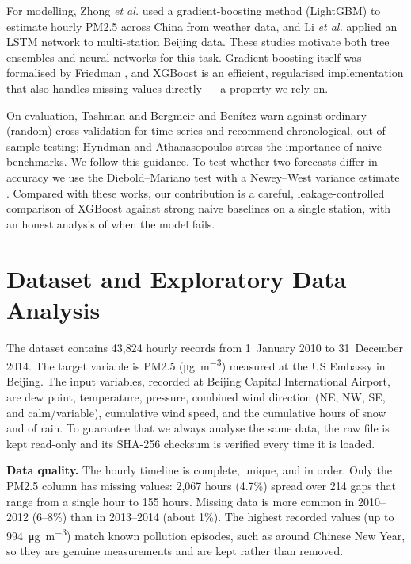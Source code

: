 \documentclass[onecolumn,11pt,journal]{IEEEtran}
\newcommand{\ugm}{\si{\micro\gram\per\cubic\metre}}
\begin{document}
For modelling, Zhong \emph{et al.} \cite{zhong2021lightgbm} used a gradient-boosting method (LightGBM) to estimate hourly PM2.5 across China from weather data, and Li \emph{et al.} \cite{li2017lstm} applied an LSTM network to multi-station Beijing data. These studies motivate both tree ensembles and neural networks for this task. Gradient boosting itself was formalised by Friedman \cite{friedman2001}, and XGBoost \cite{chen2016xgboost} is an efficient, regularised implementation that also handles missing values directly --- a property we rely on.

On evaluation, Tashman \cite{tashman2000} and Bergmeir and Ben\'itez \cite{bergmeir2012} warn against ordinary (random) cross-validation for time series and recommend chronological, out-of-sample testing; Hyndman and Athanasopoulos \cite{hyndman2021fpp3} stress the importance of naive benchmarks. We follow this guidance. To test whether two forecasts differ in accuracy we use the Diebold--Mariano test \cite{diebold1995} with a Newey--West variance estimate \cite{newey1987}. Compared with these works, our contribution is a careful, leakage-controlled comparison of XGBoost against strong naive baselines on a single station, with an honest analysis of when the model fails.

\section{Dataset and Exploratory Data Analysis}
The dataset \cite{uci_beijing} contains 43{,}824 hourly records from 1~January 2010 to 31~December 2014. The target variable is PM2.5 (\ugm{}) measured at the US Embassy in Beijing. The input variables, recorded at Beijing Capital International Airport, are dew point, temperature, pressure, combined wind direction (NE, NW, SE, and calm/variable), cumulative wind speed, and the cumulative hours of snow and of rain. To guarantee that we always analyse the same data, the raw file is kept read-only and its SHA-256 checksum is verified every time it is loaded.

\textbf{Data quality.} The hourly timeline is complete, unique, and in order. Only the PM2.5 column has missing values: 2{,}067 hours (4.7\%) spread over 214 gaps that range from a single hour to 155 hours. Missing data is more common in 2010--2012 (6--8\%) than in 2013--2014 (about 1\%). The highest recorded values (up to 994~\ugm{}) match known pollution episodes, such as around Chinese New Year, so they are genuine measurements and are kept rather than removed.
\end{document}
